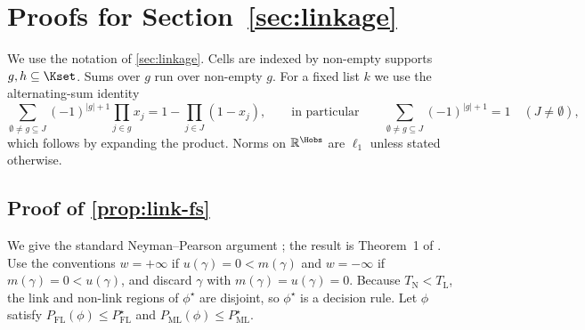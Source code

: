 \section{Proofs for Section~\ref{sec:linkage}}\label{app:linkproofs}

We use the notation of \cref{sec:linkage}. Cells are indexed by non-empty supports $g,h\subseteq\Kset$. Sums over $g$ run over non-empty $g$. For a fixed list $k$ we use the alternating-sum identity
\begin{equation}\label{eq:link-altsum}
  \sum_{\emptyset\ne g\subseteq J}(-1)^{|g|+1}\prod_{j\in g}x_j=1-\prod_{j\in J}(1-x_j),
  \qquad\text{in particular}\qquad
  \sum_{\emptyset\ne g\subseteq J}(-1)^{|g|+1}=1\quad(J\ne\emptyset),
\end{equation}
which follows by expanding the product. Norms on $\mathbb R^{\Hobs}$ are $\ell_1$ unless stated otherwise.

\subsection{Proof of \texorpdfstring{\cref{prop:link-fs}}{the Fellegi--Sunter optimality}}\label{app:link-fs}

We give the standard Neyman--Pearson argument \citep[Ch.~3]{lehmann2005}; the result is Theorem~1 of \citet{fellegi1969}. Use the conventions $w=+\infty$ if $u(\gamma)=0<m(\gamma)$ and $w=-\infty$ if $m(\gamma)=0<u(\gamma)$, and discard $\gamma$ with $m(\gamma)=u(\gamma)=0$. Because $T_{\mathrm N}<T_{\mathrm L}$, the link and non-link regions of $\phi^\star$ are disjoint, so $\phi^\star$ is a decision rule. Let $\phi$ satisfy $P_{\mathrm{FL}}(\phi)\le P_{\mathrm{FL}}^\star$ and $P_{\mathrm{ML}}(\phi)\le P_{\mathrm{ML}}^\star$.

